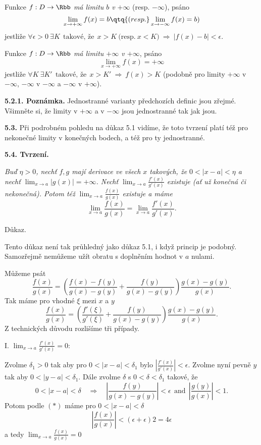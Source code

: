 \documentclass[12pt]{article}
\begin{document}
{\smallskip

Funkce $f:D\to\Rbb$ {\em má limitu $b$  v} $+\infty$ (resp. $-\infty$), psáno
$$
\lim_{x\to +\infty}f(x)= b \qtq{(resp.} \lim_{x\to -\infty}f(x)= b)
$$
jestliže
 $
 \forall \epsilon>0\ \exists K\ \ \text{takové, že}\ \ x>K \ \text{(resp.}\ x<K)\  \Rightarrow\ |f(x)-b|<\epsilon.
$

\smallskip 

Funkce $f:D\to\Rbb$ {\em má limitu $+\infty$  v  $+\infty$}, psáno
$$
\lim_{x\to +\infty}f(x)= +\infty
$$
jestliže
 $
 \forall K\ \exists K'\ \ \text{takové, že}\ \  
 x>K'\ \Rightarrow\ f(x)>K
$
(podobně pro limity $+\infty$ v $-\infty$, $-\infty$ v $-\infty$ a $-\infty$ v $+\infty$).

\medskip

{\bf 5.2.1. Poznámka.} Jednostranné varianty předchozích definic jsou zřejmé. Všimněte si, že limity v $+\infty$ a v $-\infty$ jsou jednostranné tak jak jsou.


\bigskip

{\bf 5.3.} Při podrobném pohledu na  důkaz  5.1 vidíme, že toto tvrzení platí též pro nekonečné limity v konečných bodech, a též pro ty jednostranné.

\bigskip

{\bf 5.4. Tvrzení.} {\em Buď $\eta>0$, nechť $f,g$ mají derivace ve všech $x$ takových, že $0<|x-a|<\eta$ a nechť $\lim_{x\to a}|g(x)|=+\infty$. Nechť $\lim_{x\to a}\frac{f'(x)}{g'(x)}$ existuje (ať už konečná či nekonečná).
Potom též $\lim_{x\to a}\frac{f(x)}{g(x)}$ existuje a máme
$$
\lim_{x\to a}\frac{f(x)}{g(x)}=\lim_{x\to a}\frac{f'(x)}{g'(x)}.
$$

Důkaz.} Tento důkaz není tak průhledný jako důkaz 5.1, i když princip je podobný. Samozřejmě nemůžeme užít obratu s doplněním hodnot v $a$ nulami. 

\smallskip
Můžeme psát
$$
\frac{f(x)}{g(x)}=\left(\frac{f(x)-f(y)}{g(x)-g(y)}+\frac{f(y)}{g(x)-g(y)}\right)\frac{g(x)-g(y)}{g(x)}.
$$
Tak máme pro vhodné $\xi$ mezi $x$ a $y$
\begin{equation}
\frac{f(x)}{g(x)}=\left(\frac{f'(\xi)}{g'(\xi)}+\frac{f(y)}{g(x)-g(y)}\right)\frac{g(x)-g(y)}{g(x)}. \tag{$*$}
\end{equation}
Z technických důvodu rozlišíme tři případy.

\smallskip

I. $\lim_{x\to a}\frac{f'(x)}{g'(x)}=0$: 

Zvolme $\delta_1>0$ tak aby pro $0<|x-a|<\delta_1$ bylo
$|\frac{f'(x)}{g'(x)}|<\epsilon$. Zvolme nyní pevně $y$ tak aby $0<|y-a|<\delta_1$. Dále zvolme $\delta$ s $0<\delta<\delta_1$ takové, že
$$
0<|x-a|<\delta\quad\Rightarrow\quad \left|\frac{f(y)}{g(x)-g(y)}\right|<\epsilon\ \ \text{and}\ \ \left|\frac{g(y)}{g(x)}\right|<1.
$$
Potom podle $(*)$ máme pro $0<|x-a|<\delta$
$$
\left|\frac{f(x)}{g(x)}\right|<(\epsilon +\epsilon)2=4\epsilon
$$ 
a tedy $\lim_{x\to a}\frac{f(x)}{g(x)}=0$

}
\end{document}
